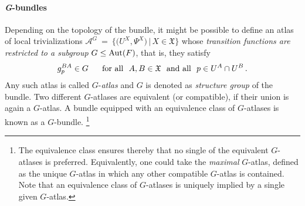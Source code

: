 \paragraph{\textit{G}-bundles}
Depending on the topology of the bundle, it might be possible to define an atlas of local trivializations
$\mathscr{A}^G\ =\ \big\{\big( U^X, \Psi^X \big) \,\big|\, X\in\mathfrak{X} \big\}$
whose \emph{transition functions are restricted to a subgroup} ${G \leq \operatorname{Aut}(F)}$, that is, they satisfy
\begin{align}
    g_p^{BA} \in G\quad\ \ \textup{for all}\ \ A,B\in\mathfrak{X}\ \ \textup{and all}\ \ p\in U^A\cap U^B \,.
\end{align}
Any such atlas is called $G$-\emph{atlas} and $G$ is denoted as \emph{structure group} of the bundle.
Two different $G$-atlases are equivalent (or compatible), if their union is again a $G$-atlas.
A bundle equipped with an equivalence class of $G$-atlases is known as a $G$-bundle.%
\footnote{
    The equivalence class ensures thereby that no single of the equivalent $G$-atlases is preferred.
    Equivalently, one could take the \emph{maximal} $G$-atlas, defined as the unique $G$-atlas in which any other compatible $G$-atlas is contained.
    Note that an equivalence class of $G$-atlases is uniquely implied by a single given $G$-atlas.
}

